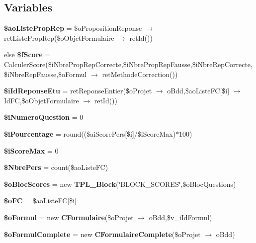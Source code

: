 \subsection*{Variables}
\begin{CompactItemize}
\item 
\textbf{\$aoListePropRep} = \$oPropositionReponse $\rightarrow$ retListePropRep(\$oObjetFormulaire $\rightarrow$ retId())\label{tableau__scores_8php_c8d9df4f59cc3a09252904ff589d972f}

\item 
else \textbf{\$fScore} = CalculerScore(\$iNbrePropRepCorrecte,\$iNbrePropRepFausse,\$iNbreRepCorrecte,\$iNbreRepFausse,\$oFormul $\rightarrow$ retMethodeCorrection())\label{tableau__scores_8php_cfcc8cae8b3c856cb17a4867ee761592}

\item 
\textbf{\$iIdReponseEtu} = retReponseEntier(\$oProjet $\rightarrow$ oBdd,\$aoListeFC[\$i] $\rightarrow$ IdFC,\$oObjetFormulaire $\rightarrow$ retId())\label{tableau__scores_8php_ba2a35489dd8f5990af874621d51d5fe}

\item 
\textbf{\$iNumeroQuestion} = 0\label{tableau__scores_8php_1835aae2c989884e936f03c5c1446978}

\item 
\textbf{\$iPourcentage} = round((\$aiScorePers[\$i]/\$iScoreMax)$\ast$100)\label{tableau__scores_8php_f49ce0f4de4e0ca3325c04e5cc4fae18}

\item 
\textbf{\$iScoreMax} = 0\label{tableau__scores_8php_84681fcc8744ae9f9c91f5c792104ef8}

\item 
\textbf{\$NbrePers} = count(\$aoListeFC)\label{tableau__scores_8php_adb77df1aee6a1d1af248c602aa8cd1c}

\item 
\textbf{\$oBlocScores} = new {\bf TPL\_\-Block}(\char`\"{}BLOCK\_\-SCORES\char`\"{},\$oBlocQuestions)\label{tableau__scores_8php_6ba1de44898abe4888b37ee0c9614a39}

\item 
\textbf{\$oFC} = \$aoListeFC[\$i]\label{tableau__scores_8php_114086c386b52b86afb024b53ed647fe}

\item 
\textbf{\$oFormul} = new {\bf CFormulaire}(\$oProjet $\rightarrow$ oBdd,\$v\_\-iIdFormul)\label{tableau__scores_8php_2945155ce2d28cb9fd90d9b31447a64d}

\item 
\textbf{\$oFormulComplete} = new {\bf CFormulaireComplete}(\$oProjet $\rightarrow$ oBdd)\label{tableau__scores_8php_04ce7bd983f3808cf826a3eacd5c1c49}


\end{CompactItemize}
